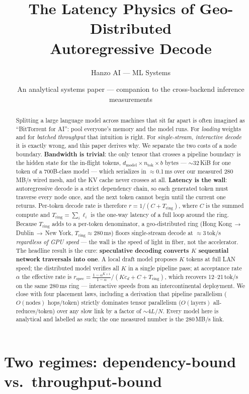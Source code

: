\documentclass[11pt]{article}
\title{\textbf{The Latency Physics of Geo-Distributed\\ Autoregressive Decode}}
\author{Hanzo AI --- ML Systems}
\date{An analytical systems paper --- companion to the cross-backend inference measurements}
\newcommand{\Tring}{\ensuremath{T_{\mathrm{ring}}}}
\newcommand{\dmodel}{\ensuremath{d_{\mathrm{model}}}}
\begin{document}
\maketitle

\begin{abstract}
Splitting a large language model across machines that sit far apart is often imagined as
``BitTorrent for AI'': pool everyone's memory and the model runs. For \emph{loading} weights and
for \emph{batched throughput} that intuition is right. For \emph{single-stream, interactive decode}
it is exactly wrong, and this paper derives why. We separate the two costs of a node boundary.
\textbf{Bandwidth is trivial}: the only tensor that crosses a pipeline boundary is the hidden state
for the in-flight tokens, \dmodel${}\times n_{\mathrm{tok}}\times b$ bytes --- $\sim$32\,KiB for one
token of a 700B-class model --- which serializes in $\approx$0.1\,ms over our measured 280\,MB/s
wired mesh, and the KV cache never crosses at all. \textbf{Latency is the wall}: autoregressive
decode is a strict dependency chain, so each generated token must traverse every node once, and the
next token cannot begin until the current one returns. Per-token decode rate is therefore
$r=1/(C+\Tring)$, where $C$ is the summed compute and $\Tring=\sum_i \ell_i$ is the one-way latency
of a full loop around the ring. Because \Tring{} adds to a per-token denominator, a geo-distributed
ring (Hong Kong\,$\to$\,Dublin\,$\to$\,New York, $\Tring\!\approx\!280$\,ms) floors single-stream
decode at $\approx$3\,tok/s \emph{regardless of GPU speed} --- the wall is the speed of light in
fiber, not the accelerator. The headline result is the cure: \textbf{speculative decoding converts
$K$ sequential network traversals into one}. A local draft model proposes $K$ tokens at full LAN
speed; the distributed model verifies all $K$ in a single pipeline pass; at acceptance rate $\alpha$
the effective rate is $r_{\mathrm{spec}}=\frac{1-\alpha^{K+1}}{1-\alpha}\big/(Kc_d+C+\Tring)$, which
recovers 12--21\,tok/s on the same 280\,ms ring --- interactive speeds from an intercontinental
deployment. We close with four placement laws, including a derivation that pipeline parallelism
($O(\text{nodes})$ hops/token) strictly dominates tensor parallelism ($O(\text{layers})$
all-reduces/token) over any slow link by a factor of $\sim\!4L/N$. Every model here is analytical
and labelled as such; the one measured number is the 280\,MB/s link.
\end{abstract}

\section{Two regimes: dependency-bound vs.\ throughput-bound}
\label{sec:dichotomy}
\end{document}
